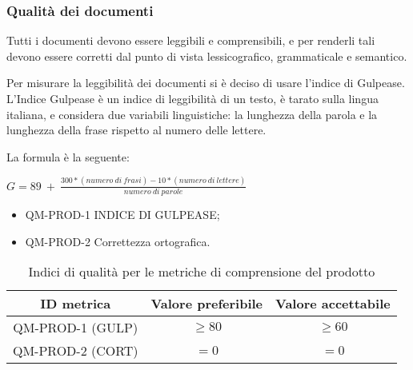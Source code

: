 \documentclass[../piano_di_qualifica.tex]{subfiles}
\begin{document}

\subsubsection{Qualità dei documenti}

Tutti i documenti devono essere leggibili e comprensibili, e per renderli tali devono essere corretti dal punto di vista lessicografico, grammaticale e semantico.\par
Per misurare la leggibilità dei documenti si è deciso di usare l’indice di Gulpease. L'Indice Gulpease è un indice di leggibilità di un testo, è tarato sulla lingua italiana, e considera due variabili linguistiche: la lunghezza della parola e la lunghezza della frase rispetto al numero delle lettere.\par
La formula è la seguente:\par

\begin{center}
	$G = 89\ +\ \frac{300 * (numero\ di\ frasi) - 10 * (numero\ di\ lettere)}{numero\ di\ parole} $
\end{center}


\begin{itemize}
\item QM-PROD-1 INDICE DI GULPEASE;
\item QM-PROD-2 Correttezza ortografica.
\end{itemize}


\begin{table}[!ht]
\centering
\begin{tabular}{|c|c|c|}
		\hline
		\rowcolor{lightgray}
		\textbf{ID metrica} & \textbf{Valore preferibile} & \textbf{Valore accettabile} \\
		\hline 
		QM-PROD-1 (GULP) & \(\ge 80\) & \(\ge 60\) \\
 		\hline
		QM-PROD-2 (CORT) & \(= 0\) & \(= 0\) \\
		\hline
\end{tabular}
\caption{Indici di qualità per le metriche di comprensione del prodotto}
\end{table}
\end{document}
